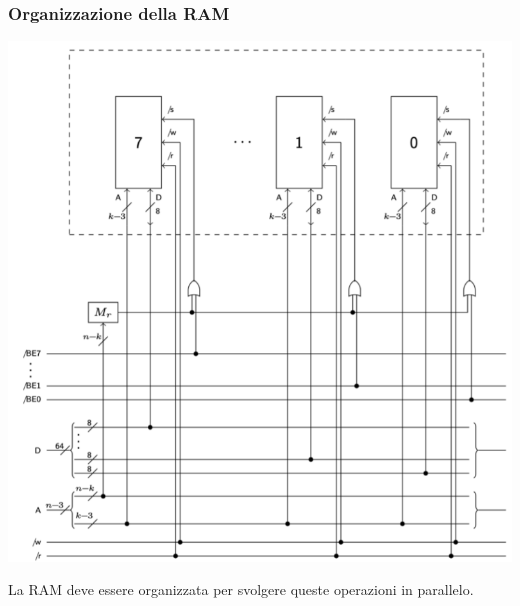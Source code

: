 \documentclass[11pt]{report}
\theoremstyle{definition}
\begin{document}
\subsubsection{Organizzazione della RAM}
\begin{center}
\includegraphics[scale=0.75]{img/10.PNG}
\end{center} 
La RAM deve essere organizzata per svolgere queste operazioni in parallelo.  
\end{document}
